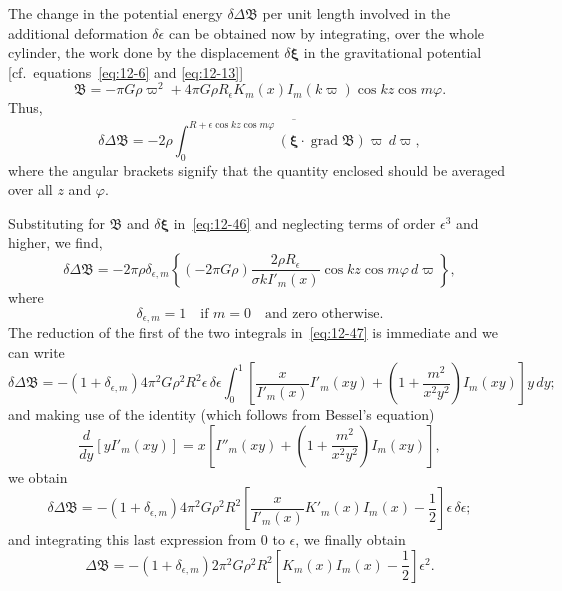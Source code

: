 The change in the potential energy $\delta\Delta\mathfrak{B}$ per unit length involved in the additional deformation $\delta\epsilon$ can be obtained now by integrating, over the whole cylinder, the work done by the displacement $\delta\boldsymbol\xi$ in the gravitational potential [cf.\ equations~\eqref{eq:12-6} and \eqref{eq:12-13}]
\begin{equation}
\label{eq:12-45}
\mathfrak{B} = -\pi G\rho \varpi^2 + 4\pi G\rho R_\epsilon K_m(x) I_m(k\varpi) \cos kz \cos m\varphi.
\end{equation}
Thus,
\begin{equation}
\label{eq:12-46}
\delta\Delta\mathfrak{B} = -2\rho \overline{\int_0^{R+\epsilon\cos kz\cos m\varphi} (\boldsymbol\xi \cdot \operatorname{grad} \mathfrak{B})\varpi\, d\varpi},
\end{equation}
where the angular brackets signify that the quantity enclosed should be averaged over all $z$ and $\varphi$.

Substituting for $\mathfrak{B}$ and $\delta\boldsymbol\xi$ in~\eqref{eq:12-46} and neglecting terms of order $\epsilon^3$ and higher, we find,
\begin{equation}
\label{eq:12-47}
\delta\Delta\mathfrak{B} = -2\pi\rho \delta_{\epsilon,m} \left\{(-2\pi G\rho)\frac{2\rho R_\epsilon}{\sigma k I'_m(x)} \cos kz \cos m\varphi \,d\varpi\right\},
\end{equation}
where
\[
\delta_{\epsilon,m} = 1 \quad \text{if } m = 0 \quad \text{and zero otherwise.}
\]
The reduction of the first of the two integrals in~\eqref{eq:12-47} is immediate and we can write
\begin{equation}
\label{eq:12-48}
\delta\Delta\mathfrak{B} = -(1+\delta_{\epsilon,m})4\pi^2 G\rho^2 R^2 \epsilon\, \delta\epsilon \int_0^1 \left[\frac{x}{I'_m(x)} I'_m(xy) + \left(1 + \frac{m^2}{x^2 y^2}\right) I_m(xy)\right] y\, dy;
\end{equation}
and making use of the identity (which follows from Bessel's equation)
\begin{equation}
\label{eq:12-49}
\frac{d}{dy}[y I'_m(xy)] = x\left[I''_m(xy) + \left(1 + \frac{m^2}{x^2 y^2}\right) I_m(xy)\right],
\end{equation}
we obtain
\begin{equation}
\label{eq:12-50}
\delta\Delta\mathfrak{B} = -(1+\delta_{\epsilon,m}) 4\pi^2 G\rho^2 R^2 \left[\frac{x}{I'_m(x)} K'_m(x) I_m(x) - \frac{1}{2}\right] \epsilon\, \delta\epsilon;
\end{equation}
and integrating this last expression from 0 to $\epsilon$, we finally obtain
\begin{equation}
\label{eq:12-51}
\Delta\mathfrak{B} = -(1+\delta_{\epsilon,m}) 2\pi^2 G\rho^2 R^2 \left[K_m(x) I_m(x) - \frac{1}{2}\right] \epsilon^2.
\end{equation}

